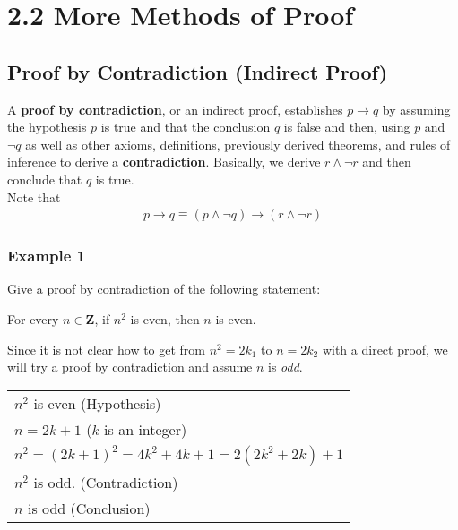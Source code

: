 \section*{2.2 More Methods of Proof}

\subsection*{Proof by Contradiction (Indirect Proof)}

A \textbf{proof by contradiction}, or an indirect proof, establishes $p \rightarrow q$ by assuming the hypothesis $p$ is true and that the conclusion $q$ is false and then, using $p$ and $\lnot q$ as well as other axioms, definitions, previously derived theorems, and rules of inference to derive a \textbf{contradiction}.  Basically, we derive $r \land \lnot r$ and then conclude that $q$ is true.\\

Note that
\begin{align*}
    p \rightarrow q \equiv (p \land \lnot q) \rightarrow (r \land \lnot r)
\end{align*}

\subsubsection*{Example 1}

Give a proof by contradiction of the following statement:
\begin{center}
    For every $n \in \textbf{Z}$, if $n^2$ is even, then $n$ is even.
\end{center}

Since it is not clear how to get from $n^2 = 2k_1$ to $n = 2k_2$ with a direct proof, we will try a proof by contradiction and assume $n$ is \textit{odd}.

\begin{table}[h]
\centering
\begin{tabular}{l}
$n^2$ is even (Hypothesis)\\
$n = 2k + 1$ ($k$ is an integer)\\
$n^2 = (2k + 1)^2 = 4k^2 + 4k + 1 = 2(2k^2 + 2k) + 1$\\
$n^2$ is odd. (Contradiction)\\
$n$ is odd (Conclusion)
\end{tabular}
\end{table}

